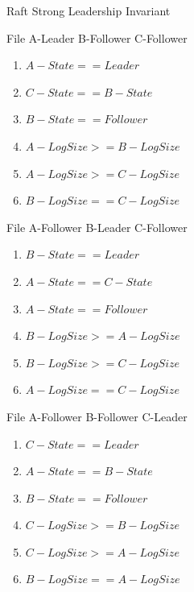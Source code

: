 \begin{table}
        \caption{Raft Strong Leadership Invariant}
        \label{table:Existance-Invariant}
    \begin{framed}
        \caption{File A-Leader B-Follower C-Follower}
        \begin{enumerate}[noitemsep]
                \item $A-State == Leader$
                \item $C-State == B-State$
                \item $B-State == Follower$
                \item $A-LogSize >= B-LogSize$
                \item $A-LogSize >= C-LogSize$
                \item $B-LogSize == C-LogSize$
        \end{enumerate}
        \caption{File A-Follower B-Leader C-Follower}
        \begin{enumerate}[noitemsep]
                \item $B-State == Leader$
                \item $A-State == C-State$
                \item $A-State == Follower$
                \item $B-LogSize >= A-LogSize$
                \item $B-LogSize >= C-LogSize$
                \item $A-LogSize == C-LogSize$
        \end{enumerate}
        \caption{File A-Follower B-Follower C-Leader}
        \begin{enumerate}[noitemsep]
                \item $C-State == Leader$
                \item $A-State == B-State$
                \item $B-State == Follower$
                \item $C-LogSize >= B-LogSize$
                \item $C-LogSize >= A-LogSize$
                \item $B-LogSize == A-LogSize$
        \end{enumerate}
   \end{framed}
\end{table}

